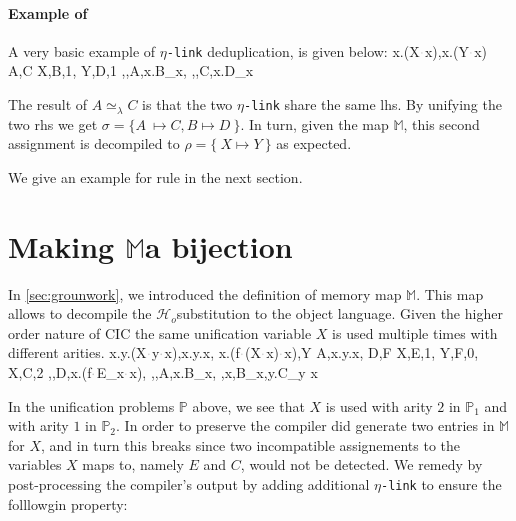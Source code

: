 \documentclass[sigconf,natbib=false,review]{acmart}
\newcommand{\appsep}{\ensuremath{\textcolor{lightgray}{\cdot}}}
\newcommand{\UnifRel}{\ensuremath{\simeq}}
\newcommand{\Ue}{\ensuremath{\UnifRel_\lambda}\xspace}
\newcommand{\linkMacro}[1]{\ensuremath{#1}\texttt{-link}\xspace}
\newcommand{\linketa} {\linkMacro{\eta}}
\newcommand{\Ho}{\texorpdfstring{\ensuremath{\mathcal{H}_o}\xspace}{Ho}}
\newcommand{\lhs}{lhs\xspace}
\newcommand{\rhs}{rhs\xspace}
\newcommand{\mapStore}{\texorpdfstring{\ensuremath{\mathbb{M}}\xspace}{M}}
\newcommand{\foUnifPb}{\ensuremath{\mathbb{P}}\xspace}
\begin{document}
\paragraph{Example of \progressetadedup}

A very basic example of \linketa deduplication, is given below:
\printAlll
  {{{\lambda x.(X\appsep x),\lambda x.(Y\appsep x)}}}
  {{{A,C}}}
  {{{X,B,1},
    {Y,D,1}}}
  {{{\eta,,A,\lambda x.B_{x}},
    {\eta,,C,\lambda x.D_{x}}}}

\noindent
The result of $A \Ue{} C$ is that the two \linketa share the same \lhs.
By unifying the two \rhs we get
$\sigma = \{ A~ \mapsto C, B \mapsto D ~\}$.
In turn, given the map \mapStore, this second assignment is decompiled to
$\rho = \{~ X \mapsto Y ~\}$ as expected.

We give an example for rule
\progressetaright in the next section.


\section{Making \mapStore a bijection}
\label{sec:invariant1}

In \cref{sec:grounwork}, we introduced the definition of memory map \mapStore.
This map allows to decompile the \Ho substitution to the object language.
Given the higher order nature of CIC the same unification
variable $X$ is used multiple times with different arities.
%
\printAlll
  {{{\lambda x.\lambda y.(X\appsep y\appsep x),\lambda x.\lambda y.x},
    {\lambda x.(f\appsep (X\appsep x)\appsep x),Y}}}
  {{{A,\lambda x.\lambda y.x},
    {D,F}}}
  {{{X,E,1},
    {Y,F,0},
    {X,C,2}}}
  {{{\eta,,D,\lambda x.(f\appsep E_{x}\appsep x)},
    {\eta,,A,\lambda x.B_{x}},
    {\eta,x,B_{x},\lambda y.C_{y x}}}}

In the unification problems \foUnifPb above, we see that $X$ is used with arity $2$ in
$\foUnifPb_1$ and with arity $1$ in $\foUnifPb_2$. 
In order to preserve  the compiler
did generate two entries in \mapStore for $X$, and in turn this
breaks  since two incompatible assignements to
the variables $X$ maps to, namely $E$ and $C$, would not be detected.
We remedy by post-processing the compiler's output by adding
additional \linketa to ensure the folllowgin property:
\end{document}
